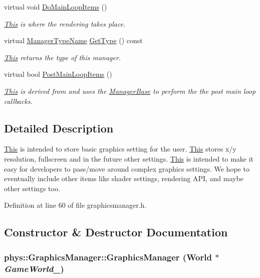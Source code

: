 \begin{DoxyCompactItemize}
virtual void \hyperlink{classphys_1_1GraphicsManager_a72e5dc563c6947cded348f19d3df41ee}{DoMainLoopItems} ()
\begin{DoxyCompactList}\small\item\em \hyperlink{structThis}{This} is where the rendering takes place. \item\end{DoxyCompactList}\item 
virtual \hyperlink{classphys_1_1ManagerBase_aaa6ccddf23892eaccb898529414f80a5}{ManagerTypeName} \hyperlink{classphys_1_1GraphicsManager_abf48faad2e09cd564442e66bc0473e58}{GetType} () const 
\begin{DoxyCompactList}\small\item\em \hyperlink{structThis}{This} returns the type of this manager. \item\end{DoxyCompactList}\item 
virtual bool \hyperlink{classphys_1_1GraphicsManager_ae2330172be150cd4d12aa2ed62b0474c}{PostMainLoopItems} ()
\begin{DoxyCompactList}\small\item\em \hyperlink{structThis}{This} is derived from and uses the \hyperlink{classphys_1_1ManagerBase}{ManagerBase} to perform the the post main loop callbacks. \item\end{DoxyCompactList}\end{DoxyCompactItemize}


\subsection{Detailed Description}
\hyperlink{structThis}{This} is intended to store basic graphics setting for the user. \hyperlink{structThis}{This} stores x/y resolution, fullscreen and in the future other settings. \hyperlink{structThis}{This} is intended to make it easy for developers to pass/move around complex graphics settings. We hope to eventually include other items like shader settings, rendering API, and maybe other settings too. 

Definition at line 60 of file graphicsmanager.h.



\subsection{Constructor \& Destructor Documentation}
\hypertarget{classphys_1_1GraphicsManager_a744d8dc01a75c3a7653f10271c24cb89}{
\subsubsection[{GraphicsManager}]{\setlength{\rightskip}{0pt plus 5cm}phys::GraphicsManager::GraphicsManager ({\bf World} $\ast$ {\em GameWorld\_\-})}}
\label{dd/d63/classphys_1_1GraphicsManager_a744d8dc01a75c3a7653f10271c24cb89}


